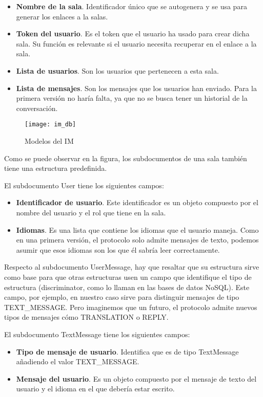 \begin{itemize}
  \item \textbf{Nombre de la sala}. Identificador único que se autogenera y se usa para generar los enlaces a la salas.
  \item \textbf{Token del usuario}. Es el token que el usuario ha usado para crear dicha sala. Su función es relevante si el usuario necesita recuperar en el enlace a la sala.
  \item \textbf{Lista de usuarios}. Son los usuarios que pertenecen a esta sala.
  \item \textbf{Lista de mensajes}. Son los mensajes que los usuarios han enviado. Para la primera versión no haría falta, ya que no se busca tener un historial de la conversación.
\end{itemize}

\begin{figure}[htp!]
  \centering
  \texttt{[image: im\_db]}
  \caption{Modelos del IM}
  \label{fig:im_db}
\end{figure}

Como se puede observar en la figura, los subdocumentos de una sala también tiene una estructura predefinida.

El subdocumento User tiene los siguientes campos:

\begin{itemize}
  \item \textbf{Identificador de usuario}. Este identificador es un objeto compuesto por el nombre del usuario y el rol que tiene en la sala.
  \item \textbf{Idiomas}. Es una lista que contiene los idiomas que el usuario maneja. Como en una primera versión, el protocolo solo admite mensajes de texto, podemos asumir que esos idiomas son los que él sabría leer correctamente.
\end{itemize}

Respecto al subdocumento UserMessage, hay que resaltar que su estructura sirve como base para que otras estructuras usen un campo que identifique el tipo de estructura (discriminator, como lo llaman en las bases de datos NoSQL). Este campo, por ejemplo, en nuestro caso sirve para distinguir mensajes de tipo TEXT\_MESSAGE. Pero imaginemos que un futuro, el protocolo admite nuevos tipos de mensajes cómo TRANSLATION o REPLY.

El subdocumento TextMessage tiene los siguientes campos:

\begin{itemize}
  \item \textbf{Tipo de mensaje de usuario}. Identifica que es de tipo TextMessage añadiendo el valor TEXT\_MESSAGE.
  \item \textbf{Mensaje del usuario}. Es un objeto compuesto por el mensaje de texto del usuario y el idioma en el que debería estar escrito.
\end{itemize}

